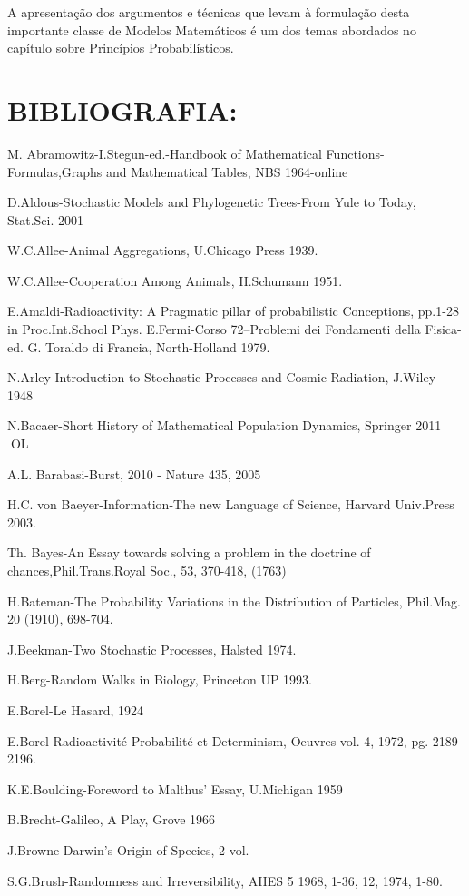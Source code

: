     A apresentação dos argumentos e técnicas que levam à formulação desta importante classe de Modelos Matemáticos é um dos temas abordados no capítulo sobre Princípios Probabilísticos.

\chapter*{BIBLIOGRAFIA:} 

M. Abramowitz-I.Stegun-ed.-Handbook of Mathematical Functions-Formulas,Graphs and Mathematical Tables, NBS 1964-online

D.Aldous-Stochastic Models and Phylogenetic Trees-From Yule to Today, Stat.Sci. 2001 

W.C.Allee-Animal Aggregations, U.Chicago Press 1939. 

W.C.Allee-Cooperation Among Animals, H.Schumann 1951. 

E.Amaldi-Radioactivity: A Pragmatic pillar of probabilistic Conceptions, pp.1-28 in Proc.Int.School Phys. E.Fermi-Corso 72–Problemi dei Fondamenti della Fisica-ed. G. Toraldo di Francia, North-Holland 1979. 

N.Arley-Introduction to Stochastic Processes and Cosmic Radiation, J.Wiley 1948 

N.Bacaer-Short History of Mathematical Population Dynamics, Springer 2011 OL 

A.L. Barabasi-Burst, 2010 - Nature 435, 2005 

H.C. von Baeyer-Information-The new Language of Science, Harvard Univ.Press 2003.

Th. Bayes-An Essay towards solving a problem in the doctrine of chances,Phil.Trans.Royal Soc., 53, 370-418, (1763) 

H.Bateman-The Probability Variations in the Distribution of Particles, Phil.Mag. 20 (1910), 698-704. 

J.Beekman-Two Stochastic Processes, Halsted 1974. 

H.Berg-Random Walks in Biology, Princeton UP 1993. 

E.Borel-Le Hasard, 1924 

E.Borel-Radioactivité Probabilité et Determinism, Oeuvres vol. 4, 1972, pg. 2189-2196. 

K.E.Boulding-Foreword to Malthus’ Essay, U.Michigan 1959 

B.Brecht-Galileo, A Play, Grove 1966 

J.Browne-Darwin’s Origin of Species, 2 vol. 

S.G.Brush-Randomness and Irreversibility, AHES 5 1968, 1-36, 12, 1974, 1-80. 

